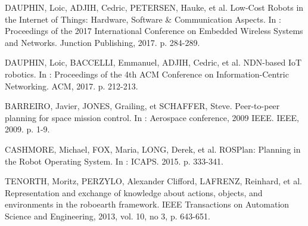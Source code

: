
DAUPHIN, Loic, ADJIH, Cedric, PETERSEN, Hauke, et al. 
Low-Cost Robots in the Internet of Things: Hardware, Software \& Communication Aspects. 
In : Proceedings of the 2017 International Conference on Embedded Wireless Systems and Networks. Junction Publishing, 2017. p. 284-289.

DAUPHIN, Loic, BACCELLI, Emmanuel, ADJIH, Cedric, et al. 
NDN-based IoT robotics. 
In : Proceedings of the 4th ACM Conference on Information-Centric Networking. ACM, 2017. p. 212-213.

BARREIRO, Javier, JONES, Grailing, et SCHAFFER, Steve. 
Peer-to-peer planning for space mission control. 
In : Aerospace conference, 2009 IEEE. IEEE, 2009. p. 1-9.

CASHMORE, Michael, FOX, Maria, LONG, Derek, et al. 
ROSPlan: Planning in the Robot Operating System. 
In : ICAPS. 2015. p. 333-341.

TENORTH, Moritz, PERZYLO, Alexander Clifford, LAFRENZ, Reinhard, et al. 
Representation and exchange of knowledge about actions, objects, and environments in the roboearth framework. 
IEEE Transactions on Automation Science and Engineering, 2013, vol. 10, no 3, p. 643-651.
